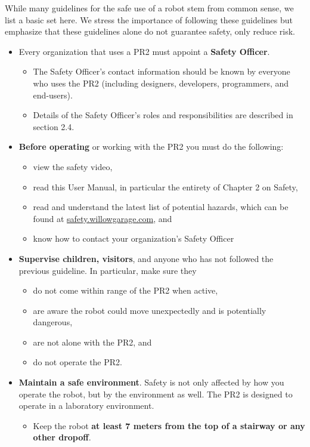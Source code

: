 While many guidelines for the safe use of a robot stem from common sense, we list a basic set here.  We stress the importance of following these guidelines but emphasize that these guidelines alone do not guarantee safety, only reduce risk.
\begin{itemize}
\item Every organization that uses a PR2 must appoint a {\bf Safety Officer}.
\begin{itemize}
\item The Safety Officer's contact information should be known by everyone who uses the PR2 (including designers, developers, programmers, and end-users).
\item Details of the Safety Officer's roles and responsibilities are described in section 2.4.
\end{itemize}
\item {\bf Before operating} or working with the PR2 you must do the following:
\begin{itemize}
\item view the safety video,
\item read this User Manual, in particular the entirety of Chapter 2 on Safety,
\item read and understand the latest list of potential hazards, which can be found at \href{http://safety.willowgarage.com}{safety.willowgarage.com}, and
\item know how to contact your organization's Safety Officer
\end{itemize}
\item {\bf Supervise children, visitors}, and anyone who has not followed the previous guideline.  In particular, make sure they
\begin{itemize}
\item do not come within range of the PR2 when active,
\item are aware the robot could move unexpectedly and is potentially dangerous,
\item are not alone with the PR2, and
\item do not operate the PR2.
\end{itemize}
\item {\bf Maintain a safe environment}.  Safety is not only affected by how you operate the robot, but by the environment as well. The PR2 is designed to operate in a laboratory environment.
\begin{itemize}
\item Keep the robot {\bf at least 7 meters from the top of a stairway or any other dropoff}.

\end{itemize}
\end{itemize}

